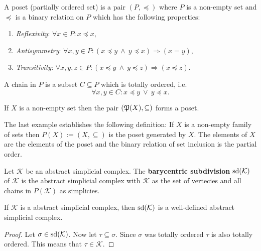 \begin{defin}
    A poset (partially ordered set) is a pair $(P, \preceq)$ where 
    $P$ is a non-empty set and 
    $\preceq$ is a binary relation on $P$ which has the following properties:
    \begin{enumerate}
        \item \textit{Reflexivity}: $\forall x \in P\colon x \preceq x$,
        \item \textit{Antisymmetry}: $\forall x, y \in P\colon (x \preceq y \: \land \: y \preceq x) \Rightarrow (x = y)$,
        \item \textit{Transitivity}: $\forall x, y, z \in P\colon (x \preceq y \: \land \: y \preceq z) \Rightarrow (x \preceq z)$.
    \end{enumerate}
    A chain in $P$ is a subset $C \subseteq P$ which is totally ordered, i.e.
    \begin{equation*}
        \forall x, y \in C\colon x \preceq y \: \lor \: y \preceq x.
    \end{equation*}
\end{defin}

\begin{ex}
    If $X$ is a non-empty set then the pair $(\mathfrak{P}(X), \subseteq)$ forms a poset.
\end{ex}

The last example establishes the following definition:
If $X$ is a non-empty family of sets then $P(X) := (X, \subseteq)$ is the poset generated by $X$. The elements of $X$
are the elements of the poset and the binary relation of set inclusion is the partial order.

\begin{defin}
    Let $\mathcal{K}$ be an abstract simplicial complex. The \textbf{barycentric subdivision} ${\rm sd}(\mathcal{K})$ of $\mathcal{K}$
    is the abstract simplicial complex with $\mathcal{K}$ as the set of vertecies and all chains in $P(\mathcal{K})$ as simplicies.
\end{defin}

\begin{thm}
    If $\mathcal{K}$ is a abstract simplicial complex, then ${\rm sd}(\mathcal{K})$ is a well-defined abstract simplicial complex.
\end{thm}

\begin{proof}
    Let $\sigma \in {\rm sd}(\mathcal{K})$. Now let $\tau \subseteq \sigma$. Since $\sigma$ was totally ordered $\tau$ is also totally ordered.
    This means that $\tau \in \mathcal{K}$.
\end{proof}

